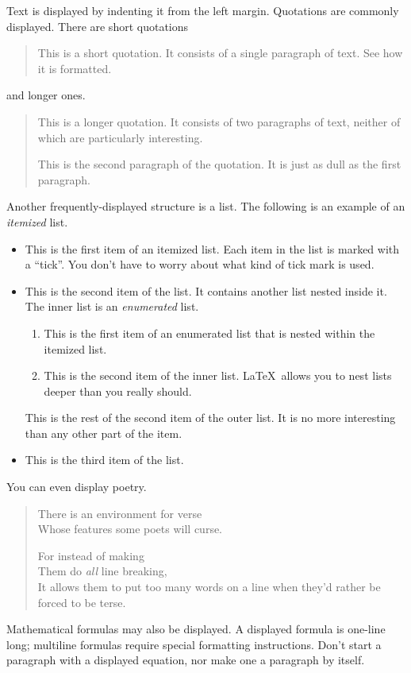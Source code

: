 \documentclass{article}      %
\begin{document}
	Text is displayed by indenting it from the left
	margin.  Quotations are commonly displayed.  There
	are short quotations
	\begin{quote}
		This is a short quotation.  It consists of a 
		single paragraph of text.  See how it is formatted.
	\end{quote}
	and longer ones.
	\begin{quotation}
		This is a longer quotation.  It consists of two
		paragraphs of text, neither of which are
		particularly interesting.
		
		This is the second paragraph of the quotation.  It
		is just as dull as the first paragraph.
	\end{quotation}
	Another frequently-displayed structure is a list.
	The following is an example of an \emph{itemized}
	list.
	\begin{itemize}
		\item This is the first item of an itemized list.
		Each item in the list is marked with a ``tick''.
		You don't have to worry about what kind of tick
		mark is used.
		
		\item This is the second item of the list.  It
		contains another list nested inside it.  The inner
		list is an \emph{enumerated} list.
		\begin{enumerate}
			\item This is the first item of an enumerated 
			list that is nested within the itemized list.
			
			\item This is the second item of the inner list.  
			\LaTeX\ allows you to nest lists deeper than 
			you really should.
		\end{enumerate}
		This is the rest of the second item of the outer
		list.  It is no more interesting than any other
		part of the item.
		\item This is the third item of the list.
	\end{itemize}
	You can even display poetry.
	\begin{verse}
		There is an environment 
		for verse \\             %
		Whose features some poets %
		will curse.   
		
		
		For instead of making\\
		Them do \emph{all} line breaking, \\
		It allows them to put too many words on a line when they'd rather be 
		forced to be terse.
	\end{verse}
	
	Mathematical formulas may also be displayed.  A
	displayed formula 
	is 
	one-line long; multiline
	formulas require special formatting instructions.
	Don't start a paragraph with a displayed equation,
	nor make one a paragraph by itself.
	
\end{document}
